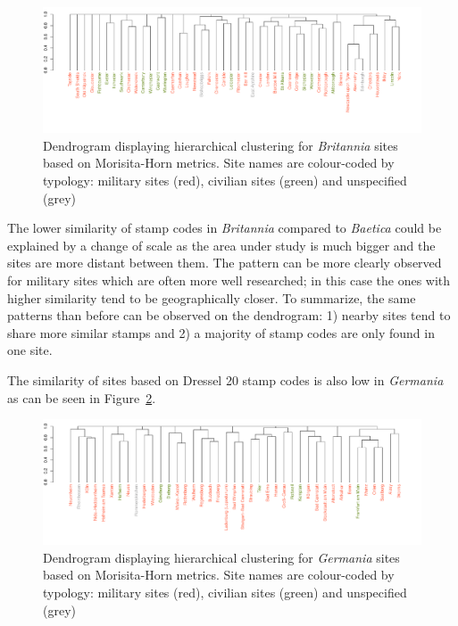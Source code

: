 \begin{figure}[htp]
	\centering
\includegraphics[angle=270,
width=0.7\linewidth]{dendrobrit5.pdf}
\caption{Dendrogram displaying hierarchical clustering for \textit{Britannia} sites based on Morisita-Horn metrics. Site names are colour-coded by typology: military sites (red), civilian sites (green) and unspecified (grey)}
\label{britmap}
\end{figure}

The lower similarity of stamp codes in \textit{Britannia} compared to \textit{Baetica} could be explained by a change of scale as the area under study is much bigger and the sites are more distant between them. The pattern can be more clearly observed for military sites which are often more well researched; in this case the ones with higher similarity tend to be geographically closer. To summarize, the same patterns than before can be observed on the dendrogram: 1) nearby sites tend to share more similar stamps and 2) a majority of stamp codes are only found in one site.
 
The similarity of sites based on Dressel 20 stamp codes is also low in \textit{Germania} as can be seen in Figure~\ref{germap}. 

\begin{figure}
	\centering
\includegraphics[angle=270, width=0.7\linewidth]{dendroger5.pdf}
\caption{Dendrogram displaying hierarchical clustering for \textit{Germania} sites based on Morisita-Horn metrics.  Site names are colour-coded by typology: military sites (red), civilian sites (green) and unspecified (grey)}
\label{germap}
\end{figure}

